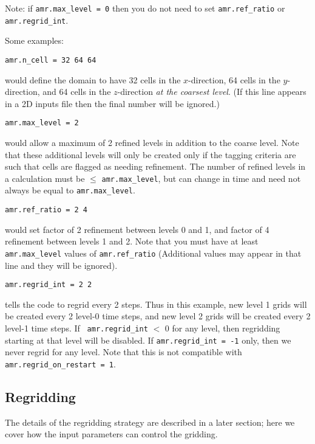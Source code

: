 Note: if {\tt amr.max\_level = 0} then you do not need to set {\tt amr.ref\_ratio} or {\tt amr.regrid\_int}.

Some examples:
\begin{lstlisting}
amr.n_cell = 32 64 64
\end{lstlisting}
would define the domain to have 32 cells in the $x$-direction, 64 cells
in the $y$-direction, and 64 cells in the $z$-direction {\em{at the
coarsest level}}.  (If this line appears in a 2D inputs file then the
final number will be ignored.)

\begin{lstlisting}
amr.max_level = 2 
\end{lstlisting}
would allow a maximum of 2 refined levels in addition to the coarse
level.  Note that these additional levels will only be created only if
the tagging criteria are such that cells are flagged as needing
refinement.  The number of refined levels in a calculation must be
$\leq$ {\tt amr.max\_level}, but can change in time and need not
always be equal to {\tt amr.max\_level}.
 
\begin{lstlisting}
amr.ref_ratio = 2 4 
\end{lstlisting}
would set factor of 2 refinement between levels 0 and 1, and factor of 4
refinement between levels 1 and 2.  Note that you must have at least
{\tt amr.max\_level} values of {\tt amr.ref\_ratio} (Additional values
may appear in that line and they will be ignored).

\begin{lstlisting}
amr.regrid_int = 2 2
\end{lstlisting}
tells the code to regrid every 2 steps.  Thus in this example, new
level 1 grids will be created every 2 level-0 time steps, and new
level 2 grids will be created every 2 level-1 time steps. If {\tt
amr.regrid\_int} $<$ 0 for any level, then regridding starting at that
level will be disabled. If {\tt amr.regrid\_int = -1} only, then we
never regrid for any level. Note that this is not compatible with {\tt
amr.regrid\_on\_restart = 1}.


\subsection{Regridding}

The details of the regridding strategy are described in a later section; here we 
cover how the input parameters can control the gridding.

